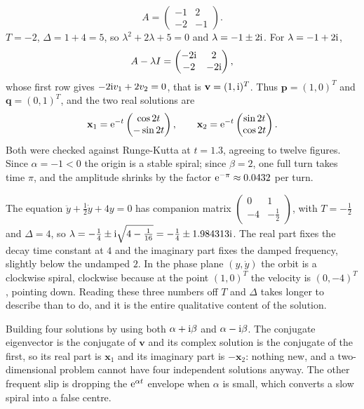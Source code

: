 \begin{worked}
\[A=\begin{pmatrix}-1&2\\-2&-1\end{pmatrix}.\]
$T=-2$, $\Delta=1+4=5$, so $\lambda^{2}+2\lambda+5=0$ and $\lambda=-1\pm2\mathrm{i}$. For $\lambda=-1+2\mathrm{i}$,
\[A-\lambda I=\begin{pmatrix}-2\mathrm{i}&2\\-2&-2\mathrm{i}\end{pmatrix},\]
whose first row gives $-2\mathrm{i} v_1+2v_2=0$, that is $\mathbf{v}=(1,\mathrm{i})^{T}$. Thus $\mathbf{p}=(1,0)^{T}$ and $\mathbf{q}=(0,1)^{T}$, and the two real solutions are
\[\mathbf{x}_1=\mathrm{e}^{-t}\begin{pmatrix}\cos2t\\-\sin2t\end{pmatrix},\qquad
\mathbf{x}_2=\mathrm{e}^{-t}\begin{pmatrix}\sin2t\\\cos2t\end{pmatrix}.\]
Both were checked against Runge-Kutta at $t=1.3$, agreeing to twelve figures. Since $\alpha=-1<0$ the origin is a stable spiral; since $\beta=2$, one full turn takes time $\pi$, and the amplitude shrinks by the factor $\mathrm{e}^{-\pi}\approx0.0432$ per turn.
\end{worked}

\begin{worked}
The equation $\ddot y+\tfrac12\dot y+4y=0$ has companion matrix $\begin{pmatrix}0&1\\-4&-\tfrac12\end{pmatrix}$, with $T=-\tfrac12$ and $\Delta=4$, so $\lambda=-\tfrac14\pm\mathrm{i}\sqrt{4-\tfrac1{16}}=-\tfrac14\pm1.984313\mathrm{i}$. The real part fixes the decay time constant at $4$ and the imaginary part fixes the damped frequency, slightly below the undamped $2$. In the phase plane $(y,\dot y)$ the orbit is a clockwise spiral, clockwise because at the point $(1,0)^{T}$ the velocity is $(0,-4)^{T}$, pointing down. Reading these three numbers off $T$ and $\Delta$ takes longer to describe than to do, and it is the entire qualitative content of the solution.
\end{worked}

\begin{trap}
Building four solutions by using both $\alpha+\mathrm{i}\beta$ and $\alpha-\mathrm{i}\beta$. The conjugate eigenvector is the conjugate of $\mathbf{v}$ and its complex solution is the conjugate of the first, so its real part is $\mathbf{x}_1$ and its imaginary part is $-\mathbf{x}_2$: nothing new, and a two-dimensional problem cannot have four independent solutions anyway. The other frequent slip is dropping the $\mathrm{e}^{\alpha t}$ envelope when $\alpha$ is small, which converts a slow spiral into a false centre.
\end{trap}

